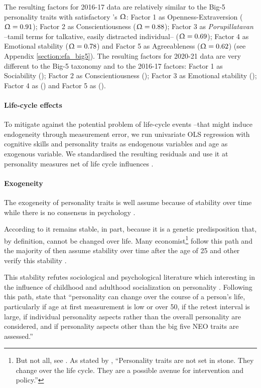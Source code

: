 \documentclass[a4paper, 11pt, onecolumn]{article}
\begin{document}
The resulting factors for 2016-17 data are relatively similar to the Big-5 personality traits with satisfactory \citeauthor{McDonald1999}'s $\Upomega$: Factor 1 as Openness-Extraversion ($\Upomega=0.91$); Factor 2 as Conscientiousness ($\Upomega=0.88$); Factor 3 as \textit{Porupillatavan} --tamil terms for talkative, easily distracted individual-- ($\Upomega=0.69$); Factor 4 as Emotional stability ($\Upomega=0.78$) and Factor 5 as Agreeableness ($\Upomega=0.62$) (see Appendix \ref{section:efa_big5}).
The resulting factors for 2020-21 data are very different to the Big-5 taxonomy and to the 2016-17 factors: Factor 1 as Sociability (); Factor 2 as Conscientiousness (); Factor 3 as Emotional stability (); Factor 4 as () and Factor 5 as ().

\paragraph{Life-cycle effects}
To mitigate against the potential problem of life-cycle events --that might induce endogeneity through measurement error, we run univariate OLS regression with cognitive skills and personality traits as endogenous variables and age as exogenous variable. %
We standardised the resulting residuals and use it at personality measures net of life cycle influences \citep{Nyhus2005, Brown2014}. 

\paragraph{Exogeneity}
The exogeneity of personality traits is well assume because of stability over time while there is no consensus in psychology \citep{Ardelt2000}.

According to \cite{Costa1997, McCrae2000} it remains stable, in part, because it is a genetic predisposition that, by definition, cannot be changed over life.
Many economist\footnote{But not all, see \cite{Borghans2008, Almlund2011, Heckman2011}. As stated by \cite{Heckman2011}, ``Personality traits are not set in stone. They change over the life cycle. They are a possible avenue for intervention and policy.''} follow this path and the majority of then assume stability over time after the age of 25 and other verify this stability \citep{CobbClark2011}.

This stability refutes sociological and psychological literature which interesting in the influence of childhood and adulthood socialization on personality \citep{Mortimer1978, Moen1995}.
Following this path, \cite{Ardelt2000} state that ``personality can change over the course of a person's life, particularly if age at first measurement is low or over 50, if the retest interval is large, if individual personality aspects rather than the overall personality are considered, and if personality aspects other than the big five NEO traits are assessed.''
\end{document}
